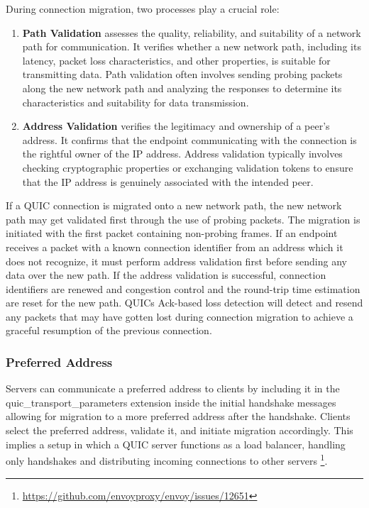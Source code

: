 During connection migration, two processes play a crucial role:
\begingroup
\renewcommand\labelenumi{(\theenumi)}
\begin{enumerate}
\item \textbf{Path Validation} assesses the quality, reliability, and suitability of a network path for communication. It verifies whether a new network path, including its latency, packet loss characteristics, and other properties, is suitable for transmitting data. Path validation often involves sending probing packets along the new network path and analyzing the responses to determine its characteristics and suitability for data transmission.\cite[46]{rfc9000} \label{path_validation}
\item \textbf{Address Validation} verifies the legitimacy and ownership of a peer's address. It confirms that the endpoint communicating with the connection is the rightful owner of the IP address. Address validation typically involves checking cryptographic properties or exchanging validation tokens to ensure that the IP address is genuinely associated with the intended peer. \cite[42]{rfc9000} \label{address_validation}
\end{enumerate}
\endgroup

If a QUIC connection is migrated onto a new network path, the new network path may get validated first through the use of probing packets. The migration is initiated with the first packet containing non-probing frames. If an endpoint receives a packet with a known connection identifier from an address which it does not recognize, it must perform address validation first before sending any data over the new path. If the address validation is successful, connection identifiers are renewed and congestion control and the round-trip time estimation are reset for the new path. QUICs Ack-based loss detection will detect and resend any packets that may have gotten lost during connection migration to achieve a graceful resumption of the previous connection.

\subsubsection{Preferred Address}

Servers can communicate a preferred address to clients by including it in the \\ quic\_transport\_parameters extension inside the initial handshake messages allowing for migration to a more preferred address after the handshake. Clients select the preferred address, validate it, and initiate migration accordingly. This implies a setup in which a QUIC server functions as a load balancer, handling only handshakes and distributing incoming connections to other servers \footnote{\url{https://github.com/envoyproxy/envoy/issues/12651}}.


